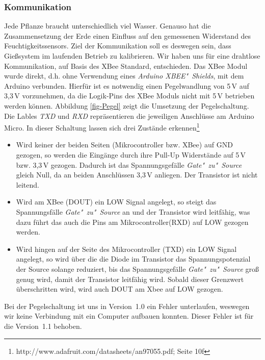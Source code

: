 \subsubsection{Kommunikation}
Jede Pflanze braucht unterschiedlich viel Wasser. 
Genauso hat die Zusammensetzung der Erde einen Einfluss auf den gemessenen Widerstand des Feuchtigkeitssensors.
Ziel der Kommunikation soll es deswegen sein, dass Gießsystem im laufenden Betrieb zu kalibrieren. 
Wir haben uns für eine drahtlose Kommunikation, auf Basis des XBee Standard, entschieden. 
Das XBee Modul wurde direkt, d.h. ohne Verwendung eines \emph{Arduino XBEE"~Shields}, mit dem Arduino verbunden. 
Hierfür ist es notwendig einen Pegelwandlung von 5\,V auf 3,3\,V vorzunehmen, da die Logik-Pins des XBee Moduls nicht mit 5\,V betrieben werden können. 
Abbildung \ref{fig-Pegel} zeigt die Umsetzung der Pegelschaltung. Die Lables \emph{TXD} und \emph{RXD} repräsentieren die jeweiligen Anschlüsse am Arduino Micro. In dieser Schaltung lassen sich drei Zustände erkennen\footnote{http://www.adafruit.com/datasheets/an97055.pdf; Seite 10f}
\begin{itemize}
\item Wird keiner der beiden Seiten (Mikrocontroller bzw. XBee) auf GND gezogen, so werden die Eingänge durch ihre  Pull-Up 	Widerstände auf 5\,V bzw. 3,3\,V gezogen. Dadurch ist das Spannungsgefälle \emph{Gate"~zu"~Source} gleich Null, da an beiden 	Anschlüssen 3,3\,V anliegen. Der Transistor ist nicht leitend.
\item Wird am XBee (DOUT) ein LOW Signal angelegt, so steigt das Spannungsfälle \emph{Gate"~zu"~Source} an und der Transistor wird leitfähig, was dazu führt das auch die Pins am Mikrocontroller(RXD) auf LOW gezogen werden.
\item Wird hingen auf der Seite des Mikrocontroller (TXD) ein LOW Signal angelegt, so wird über die die Diode im Transistor das Spannungspotenzial der Source solange reduziert, bis das Spannungsgefälle \emph{Gate"~zu"~Source} groß genug wird, damit der Transistor leitfähig wird. Sobald dieser Grenzwert überschritten wird, wird auch DOUT am Xbee auf LOW gezogen.
\end{itemize}

Bei der Pegelschaltung ist uns in Version~1.0 ein Fehler unterlaufen, weswegen wir keine Verbindung mit ein Computer aufbauen konnten. Dieser Fehler ist für die Version~1.1 behoben.


